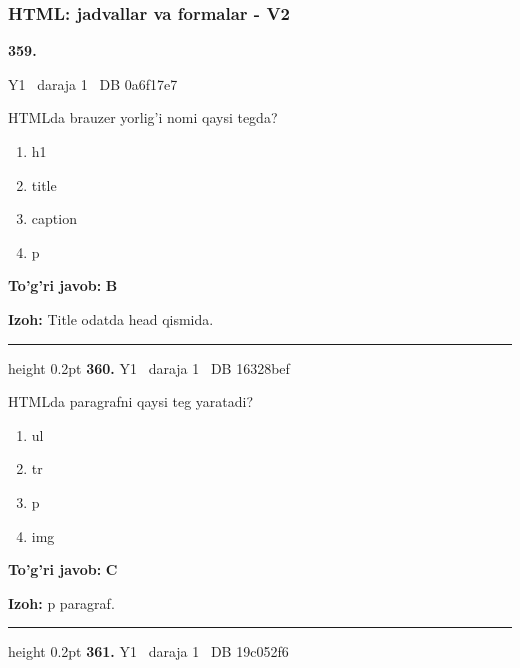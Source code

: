 \documentclass[10pt,a4paper,oneside]{article}
\begin{document}
\subsubsection{HTML: jadvallar va formalar - V2}
\hypertarget{q359}{\textbf{\color{ink}359.}}  {\color{muted}\scriptsize Y1 \textbullet\ daraja 1 \textbullet\ DB 0a6f17e7}
\par
HTMLda brauzer yorlig'i nomi qaysi tegda?
\begin{enumerate}[label=\Alph*),leftmargin=9mm]
\item h1
\item title
\item caption
\item p
\end{enumerate}
\begin{tcolorbox}[enhanced,breakable,colback=teal!4,colframe=teal!45!black,boxrule=0.45pt,arc=1.2mm,left=2.8mm,right=2.8mm,top=2mm,bottom=2mm,before skip=2mm,after skip=2mm]
\textbf{\color{teal}To'g'ri javob:} \textbf{B}
\par\smallskip
\textbf{Izoh:} Title odatda head qismida.
\end{tcolorbox}
\vspace{2mm}\hrule height 0.2pt \vspace{4mm}
\hypertarget{q360}{\textbf{\color{ink}360.}}  {\color{muted}\scriptsize Y1 \textbullet\ daraja 1 \textbullet\ DB 16328bef}
\par
HTMLda paragrafni qaysi teg yaratadi?
\begin{enumerate}[label=\Alph*),leftmargin=9mm]
\item ul
\item tr
\item p
\item img
\end{enumerate}
\begin{tcolorbox}[enhanced,breakable,colback=teal!4,colframe=teal!45!black,boxrule=0.45pt,arc=1.2mm,left=2.8mm,right=2.8mm,top=2mm,bottom=2mm,before skip=2mm,after skip=2mm]
\textbf{\color{teal}To'g'ri javob:} \textbf{C}
\par\smallskip
\textbf{Izoh:} p paragraf.
\end{tcolorbox}
\vspace{2mm}\hrule height 0.2pt \vspace{4mm}
\hypertarget{q361}{\textbf{\color{ink}361.}}  {\color{muted}\scriptsize Y1 \textbullet\ daraja 1 \textbullet\ DB 19c052f6}
\par
\end{document}
